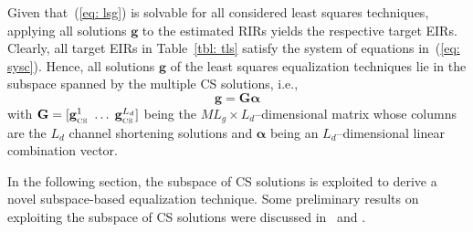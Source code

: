 \documentclass[11pt,draftcls,onecolumn]{IEEEtran}
\begin{document}
Given that~(\ref{eq: lsg}) is solvable for all considered least squares techniques, applying all solutions $\mathbf{g}$ to the estimated RIRs yields the respective target EIRs.  
Clearly, all target EIRs in Table~\ref{tbl: tls} satisfy the system of equations in~(\ref{eq: sysc}).
Hence, all solutions $\mathbf{g}$ of the least squares equalization techniques lie in the subspace spanned by the multiple CS solutions, i.e., 
\begin{equation}
\boxed{\mathbf{g} = \mathbf{G} \boldsymbol \alpha}
\end{equation}
with $\mathbf{G} = [\mathbf{g}_{_{\rm CS}}^1 \; \ldots \; \mathbf{g}_{_{\rm CS}}^{L_d}]$ being the $ML_g \times L_d$--dimensional matrix whose columns are the $L_d$ channel shortening solutions and $\boldsymbol \alpha$ being an $L_d$--dimensional linear combination vector.

In the following section, the subspace of CS solutions is exploited to derive a novel subspace-based equalization technique. 
Some preliminary results on exploiting the subspace of CS solutions were discussed in~\cite{Kodrasi_ICASSP_2013} and \cite{Kodrasi_EUSIPCO_2013}.
\end{document}
